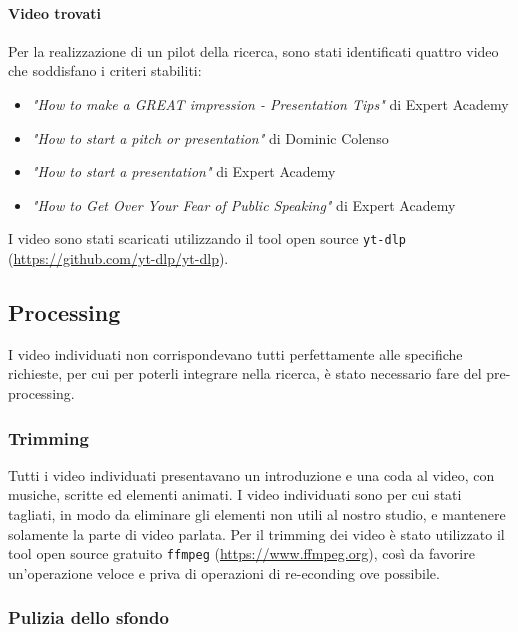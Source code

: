 \paragraph{Video trovati}

Per la realizzazione di un pilot della ricerca, sono stati identificati quattro video che soddisfano i criteri stabiliti:
\begin{itemize}
    \item \textit{"How to make a GREAT impression - Presentation Tips"} di Expert Academy %
    \item \textit{"How to start a pitch or presentation"} di Dominic Colenso %
    \item \textit{"How to start a presentation"} di Expert Academy %
    \item \textit{"How to Get Over Your Fear of Public Speaking"} di Expert Academy %
\end{itemize}

I video sono stati scaricati utilizzando il tool open source \verb|yt-dlp| (\url{https://github.com/yt-dlp/yt-dlp}).

\subsection{Processing}

I video individuati non corrispondevano tutti perfettamente alle specifiche richieste, per cui per poterli integrare nella ricerca, è stato necessario fare del pre-processing.

\subsubsection{Trimming}

Tutti i video individuati presentavano un introduzione e una coda al video, con musiche, scritte ed elementi animati. I video individuati sono per cui stati tagliati, in modo da eliminare gli elementi non utili al nostro studio, e mantenere solamente la parte di video parlata. Per il trimming dei video è stato utilizzato il tool open source gratuito \verb|ffmpeg| (\url{https://www.ffmpeg.org}), così da favorire un'operazione veloce e priva di operazioni di re-econding ove possibile.

\subsubsection{Pulizia dello sfondo}

